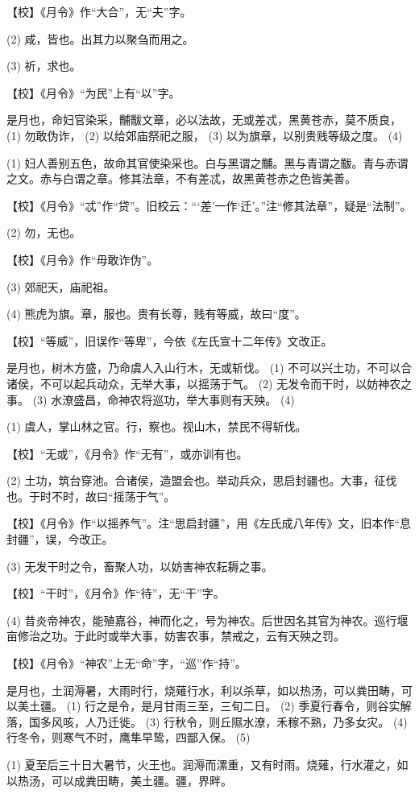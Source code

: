 \documentclass[12pt,UTF8]{ctexbook}
\begin{document}
【校】《月令》作“大合”，无“夫”字。

(2) 咸，皆也。出其力以聚刍而用之。

(3) 祈，求也。

【校】《月令》“为民”上有“以”字。

是月也，命妇官染采，黼黻文章，必以法故，无或差忒，黑黄苍赤，莫不质良， (1) 勿敢伪诈， (2) 以给郊庙祭祀之服， (3) 以为旗章，以别贵贱等级之度。 (4)

(1) 妇人善别五色，故命其官使染采也。白与黑谓之黼。黑与青谓之黻。青与赤谓之文。赤与白谓之章。修其法章，不有差忒，故黑黄苍赤之色皆美善。

【校】《月令》“忒”作“贷”。旧校云：“‘差’一作‘迁’。”注“修其法章”，疑是“法制”。

(2) 勿，无也。

【校】《月令》作“毋敢诈伪”。

(3) 郊祀天，庙祀祖。

(4) 熊虎为旗。章，服也。贵有长尊，贱有等威，故曰“度”。

【校】“等威”，旧误作“等卑”，今依《左氏宣十二年传》文改正。

是月也，树木方盛，乃命虞人入山行木，无或斩伐。 (1) 不可以兴土功，不可以合诸侯，不可以起兵动众，无举大事，以摇荡于气。 (2) 无发令而干时，以妨神农之事。 (3) 水潦盛昌，命神农将巡功，举大事则有天殃。 (4)

(1) 虞人，掌山林之官。行，察也。视山木，禁民不得斩伐。

【校】“无或”，《月令》作“无有”，或亦训有也。

(2) 土功，筑台穿池。合诸侯，造盟会也。举动兵众，思启封疆也。大事，征伐也。于时不时，故曰“摇荡于气”。

【校】《月令》作“以摇养气”。注“思启封疆”，用《左氏成八年传》文，旧本作“息封疆”，误，今改正。

(3) 无发干时之令，畜聚人功，以妨害神农耘耨之事。

【校】“干时”，《月令》作“待”，无“干”字。

(4) 昔炎帝神农，能殖嘉谷，神而化之，号为神农。后世因名其官为神农。巡行堰亩修治之功。于此时或举大事，妨害农事，禁戒之，云有天殃之罚。

【校】《月令》“神农”上无“命”字，“巡”作“持”。

是月也，土润溽暑，大雨时行，烧薙行水，利以杀草，如以热汤，可以粪田畴，可以美土疆。 (1) 行之是令，是月甘雨三至，三旬二日。 (2) 季夏行春令，则谷实解落，国多风咳，人乃迁徙。 (3) 行秋令，则丘隰水潦，禾稼不熟，乃多女灾。 (4) 行冬令，则寒气不时，鹰隼早鸷，四鄙入保。 (5)

(1) 夏至后三十日大暑节，火王也。润溽而漯重，又有时雨。烧薙，行水灌之，如以热汤，可以成粪田畴，美土疆。疆，界畔。
\end{document}
